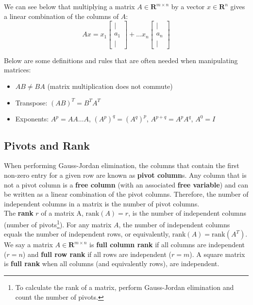 \documentclass[11pt]{article}
\theoremstyle{plain}
\theoremstyle{definition}
\theoremstyle{remark}
\numberwithin{equation}{section}
\begin{document}
We can see below that multiplying a matrix $A \in \mathbf{R}^{m \times n}$ by a vector $x \in \mathbf{R}^n$ gives a linear combination of the columns of $A$:
\begin{equation*}
A x = x_1 \begin{bmatrix} | \\ a_1 \\ | \end{bmatrix} + \dots x_n \begin{bmatrix} | \\ a_n \\ | \end{bmatrix}
\end{equation*}

Below are some definitions and rules that are often needed when manipulating matrices:
\begin{itemize}[noitemsep]
\item $AB \neq BA$ (matrix multiplication does not commute)
\item Transpose: $(AB)^T = B^T A^T$
\item Exponents: $A^p = A A \dots A$, \quad $(A^p)^q = (A^q)^p$, \quad $A^{p+q} = A^p A^q$, \quad $A^0 = I$
\end{itemize}


\subsection{Pivots and Rank}

When performing Gauss-Jordan elimination, the columns that contain the first non-zero entry for a given row are known as {\bf pivot column}s. Any column that is not a pivot column is a {\bf free column} (with an associated {\bf free variable}) and can be written as a linear combination of the pivot columns. Therefore, the number of independent columns in a matrix is the number of pivot columns.
\\

The {\bf rank} $r$ of a matrix A, $\text{rank}(A) = r$, is the number of independent columns (number of pivots\footnote{To calculate the rank of a matrix, perform Gauss-Jordan elimination and count the number of pivots.}). For any matrix $A$, the number of independent columns equals the number of independent rows, or equivalently, $\text{rank}(A) = \text{rank}(A^T)$. 
\\

We say a matrix $A \in \mathbf{R}^{m \times n}$ is {\bf full column rank} if all columns are independent ($r = n$) and {\bf full row rank} if all rows are independent ($r = m$). A square matrix is {\bf full rank} when all columns (and equivalently rows), are independent.
\end{document}
